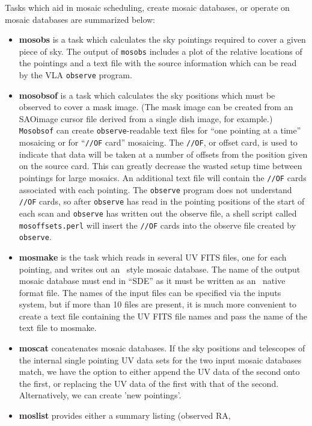 Tasks which aid in mosaic scheduling, create mosaic databases, or
operate on mosaic databases are summarized below:
\begin{itemize}
\item {\bf mosobs } is a task which calculates the sky pointings required
	to cover a given piece of sky.  The output of {\tt mosobs} includes
	a plot of the relative locations of the pointings and a text
	file with the source information which can be read by the
	VLA {\tt observe} program.
\item {\bf mosobsof } is a task which calculates the sky positions
	which must be observed to cover a mask image.  (The mask image
	can be created from an SAOimage cursor file derived from a
	single dish image, for example.)  {\tt Mosobsof} can create
	{\tt observe}-readable text files for ``one pointing at a
	time'' mosaicing or for ``{\tt //OF} card'' mosaicing.  The
	{\tt //OF}, or offset card, is used to indicate that data will
	be taken at a number of offsets from the position given on the
	source card.  This can greatly decrease the wasted setup time
	between pointings for large mosaics.  An additional text file
	will contain the {\tt //OF} cards associated with each
	pointing.  The {\tt observe} program does not understand {\tt
	//OF} cards, so after {\tt observe} has read in the pointing
	positions of the start of each scan and {\tt observe} has
	written out the observe file, a shell script called {\tt
	mosoffsets.perl} will insert the {\tt //OF} cards into the
	observe file created by {\tt observe}.
\item {\bf mosmake } is the task which reads in several UV FITS files,
	one for each pointing, and writes out an \sde\ style mosaic
	database.  The name of the output mosaic database must end in
	``SDE'' as it must be written as an \sde\ native format file.
	The names of the input files can be specified via the inputs
	system, but if more than 10 files are present, it is much more
	convenient to create a text file containing the UV FITS file
	names and pass the name of the text file to mosmake.
\item {\bf moscat } concatenates mosaic databases.
	If the sky positions and telescopes of the internal 
	single pointing UV data sets for the two input mosaic databases
	match, we have the option to either append the UV data of the
	second onto the first, or replacing the UV data of the first
	with that of the second.  Alternatively, we can create 'new pointings'.
\item {\bf moslist} provides either a summary listing (observed RA,

\end{itemize}
